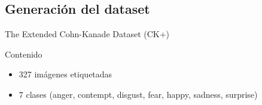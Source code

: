 \documentclass{beamer}
\begin{document}
\subsection{Generación del dataset}
\begin{frame}{The Extended Cohn-Kanade Dataset
(CK+)}
\begin{figure}[h!]
  \begin{center}
    \subcapcentertrue
  \end{center}
\end{figure}
\begin{block}{Contenido}
\begin{itemize}
    \item 327 imágenes etiquetadas
    \item 7 clases (anger, contempt, disgust, fear, happy, sadness, surprise)
\end{itemize}
\end{block}
\end{frame}
\end{document}
